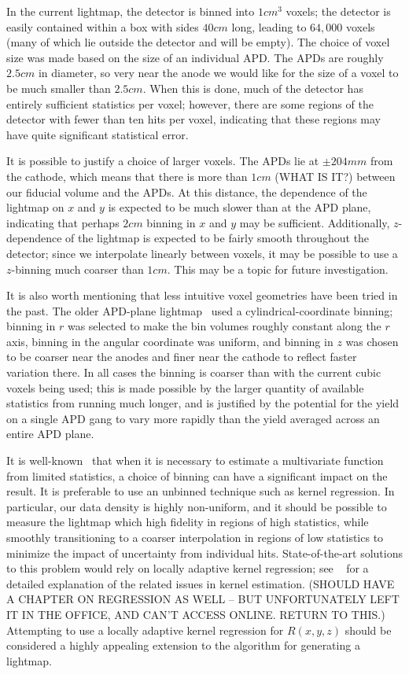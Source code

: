 In the current lightmap, the detector is binned into $1 cm^3$ voxels; the detector is easily contained within a box with sides $40 cm$ long, leading to $64,000$ voxels (many of which lie outside the detector and will be empty).  The choice of voxel size was made based on the size of an individual APD.  The APDs are roughly $2.5 cm$ in diameter, so very near the anode we would like for the size of a voxel to be much smaller than $2.5 cm$.  When this is done, much of the detector has entirely sufficient statistics per voxel; however, there are some regions of the detector with fewer than ten hits per voxel, indicating that these regions may have quite significant statistical error.

It is possible to justify a choice of larger voxels.  The APDs lie at $\pm 204 mm$ from the cathode, which means that there is more than $1 cm$ (WHAT IS IT?) between our fiducial volume and the APDs.  At this distance, the dependence of the lightmap on $x$ and $y$ is expected to be much slower than at the APD plane, indicating that perhaps $2 cm$ binning in $x$ and $y$ may be sufficient.  Additionally, $z$-dependence of the lightmap is expected to be fairly smooth throughout the detector; since we interpolate linearly between voxels, it may be possible to use a $z$-binning much coarser than $1 cm$.  This may be a topic for future investigation.

It is also worth mentioning that less intuitive voxel geometries have been tried in the past.  The older APD-plane lightmap~\cite{ThesisSteve} used a cylindrical-coordinate binning; binning in $r$ was selected to make the bin volumes roughly constant along the $r$ axis, binning in the angular coordinate was uniform, and binning in $z$ was chosen to be coarser near the anodes and finer near the cathode to reflect faster variation there.  In all cases the binning is coarser than with the current cubic voxels being used; this is made possible by the larger quantity of available statistics from running much longer, and is justified by the potential for the yield on a single APD gang to vary more rapidly than the yield averaged across an entire APD plane.

It is well-known~\cite{MultivariateDensityScott} that when it is necessary to estimate a multivariate function from limited statistics, a choice of binning can have a significant impact on the result.  It is preferable to use an unbinned technique such as kernel regression.  In particular, our data density is highly non-uniform, and it should be possible to measure the lightmap which high fidelity in regions of high statistics, while smoothly transitioning to a coarser interpolation in regions of low statistics to minimize the impact of uncertainty from individual hits.  State-of-the-art solutions to this problem would rely on locally adaptive kernel regression; see ~\cite{MultivariateDensityScott} for a detailed explanation of the related issues in kernel estimation.  (SHOULD HAVE A CHAPTER ON REGRESSION AS WELL -- BUT UNFORTUNATELY LEFT IT IN THE OFFICE, AND CAN'T ACCESS ONLINE.  RETURN TO THIS.)  Attempting to use a locally adaptive kernel regression for $R(x,y,z)$ should be considered a highly appealing extension to the algorithm for generating a lightmap.

